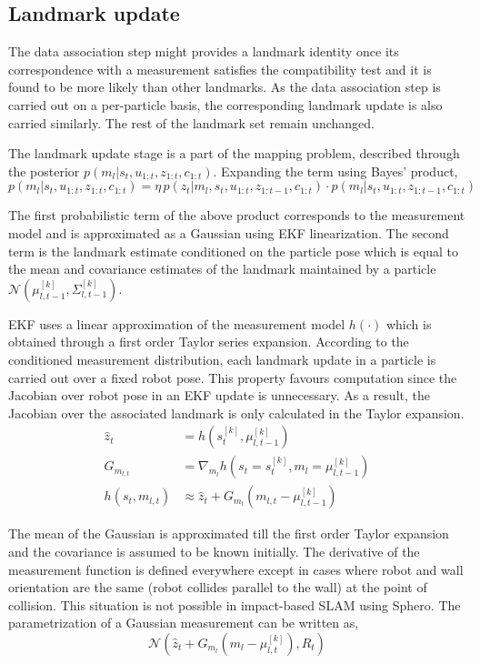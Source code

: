 \subsection{Landmark update} \label{sec::land_update}
The data association step might provides a landmark identity once its correspondence with a measurement satisfies the compatibility test and it is found to be more likely than other landmarks. As the data association step is carried out on a per-particle basis, the corresponding landmark update is also carried similarly. The rest of the landmark set remain unchanged.

The landmark update stage is a part of the mapping problem, described through the posterior $p(m_l|s_t,u_{1:t},z_{1:t},c_{1:t})$. Expanding the term using Bayes' product,
\begin{equation}
p(m_l|s_t,u_{1:t},z_{1:t},c_{1:t})=\eta\,p(z_t|m_l,s_t,u_{1:t},z_{1:t-1},c_{1:t})\cdot p(m_l|s_t,u_{1:t},z_{1:t-1},c_{1:t}) 
\end{equation}

The first probabilistic term of the above product corresponds to the measurement model and is approximated as a Gaussian using EKF linearization. The second term is the landmark estimate conditioned on the particle pose which is equal to the mean and covariance estimates of the landmark maintained by a particle $\mathcal{N}\left(\mu^{[k]}_{l,t-1},\Sigma^{[k]}_{l,t-1}\right)$.
 
EKF uses a linear approximation of the measurement model $h(\cdot)$ which is obtained through a first order Taylor series expansion. According to the conditioned measurement distribution, each landmark update in a particle is carried out over a fixed robot pose. This property favours computation since the Jacobian over robot pose  in an EKF update is unnecessary. As a result, the Jacobian over the associated landmark  is only calculated in the Taylor expansion. 
\begin{align}
\hat{z}_t &= h(s_t^{[k]},\mu^{[k]}_{l,t-1}) \\
G_{m_{l,t}} &= \nabla_{m_l} h(s_t=s_t^{[k]},m_l=\mu^{[k]}_{l,t-1}) \\
h(s_t,m_{l,t}) &\approx \hat{z}_t+G_{m_l}(m_{l,t}-\mu^{[k]}_{l,t-1})
\label{taylor_approx}
\end{align}

The mean of the Gaussian is approximated till the first order Taylor expansion and the covariance is assumed to be known initially. The derivative of the measurement function is defined everywhere except in cases where robot and wall orientation are the same (robot collides parallel to the wall) at the point of collision. This situation is not possible in impact-based SLAM using Sphero. The parametrization of a Gaussian measurement can be written as,
\begin{equation}
\mathcal{N}(\hat{z}_t+G_{m_l}(m_l-\mu^{[k]}_{l,t}),R_t)
\end{equation}

